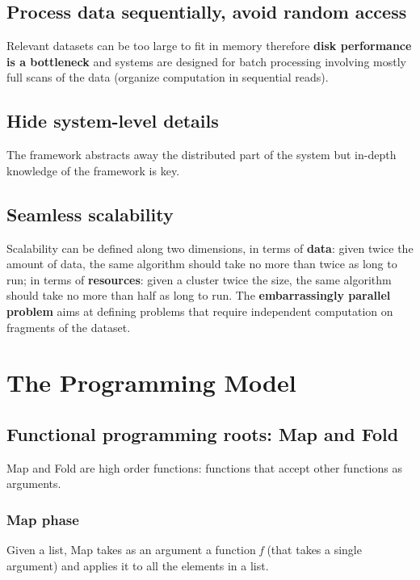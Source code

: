 \subsection*{Process data sequentially, avoid random access}
Relevant datasets can be too large to fit in memory therefore \textbf{disk performance is a bottleneck} and systems are designed for batch processing involving mostly full scans of the data (organize computation in sequential reads).
\subsection*{Hide system-level details}
The framework abstracts away the distributed part of the system but in-depth knowledge of the framework is key.
\subsection*{Seamless scalability}
Scalability can be defined along two dimensions, in terms of \textbf{data}: given twice the amount of data, the same algorithm should take no more than twice as long to run; in terms of \textbf{resources}: given a cluster twice the size, the same algorithm should take no more than half as long to run.
The \textbf{embarrassingly parallel problem} aims at defining problems that require independent computation on fragments of the dataset.

\section{The Programming Model}
\subsection{Functional programming roots: Map and Fold}
Map and Fold are high order functions: functions that accept other functions as arguments.
\subsubsection{Map phase}
Given a list, Map takes as an argument a function \textit{f} (that takes a single argument) and applies it to all the elements in a list.

